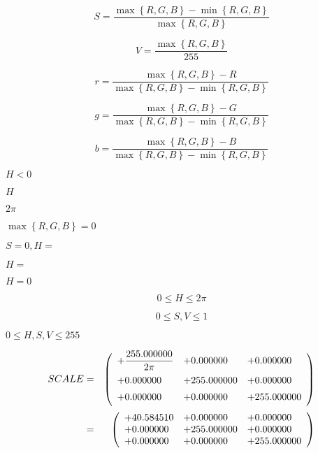 \documentclass{article}
\begin{document}
\[ S=\frac{\max \left\{ R, G, B \right\} - \min \left\{ R, G, B \right\}}{\max \left\{ R, G, B \right\}} \]
\pagebreak

\[ V=\frac{\max \left\{ R, G, B \right\}}{255} \]
\pagebreak

\[ r=\frac{\max \left\{ R, G, B \right\} - R}{\max \left\{ R, G, B \right\} - \min \left\{ R, G, B \right\}} \]
\pagebreak

\[ g=\frac{\max \left\{ R, G, B \right\} - G}{\max \left\{ R, G, B \right\} - \min \left\{ R, G, B \right\}} \]
\pagebreak

\[ b=\frac{\max \left\{ R, G, B \right\} - B}{\max \left\{ R, G, B \right\} - \min \left\{ R, G, B \right\}} \]
\pagebreak

$H<0$
\pagebreak

$H$
\pagebreak

$2\pi$
\pagebreak

$\max \left\{ R, G, B \right\}=0$
\pagebreak

$S=0,H=$
\pagebreak

$H=$
\pagebreak

$H=0$
\pagebreak

\[ 0 \le H \le 2\pi \]
\pagebreak

\[ 0 \le S, V \le 1 \]
\pagebreak

$ 0 \le H, S, V \le 255 $
\pagebreak

\begin{eqnarray*} SCALE &=& \left( \begin{array}{lll} +\dfrac{255.000000}{2\pi} & +0.000000 & +0.000000 \vspace{.5em} \\ +0.000000 & +255.000000 & +0.000000 \vspace{.5em} \\ +0.000000 & +0.000000 & +255.000000 \vspace{.5em} \\ \end{array} \right) \\ &=& \left( \begin{array}{lll} +40.584510 & +0.000000 & +0.000000 \\ +0.000000 & +255.000000 & +0.000000 \\ +0.000000 & +0.000000 & +255.000000 \\ \end{array} \right) \\ \end{eqnarray*}
\pagebreak
\end{document}
